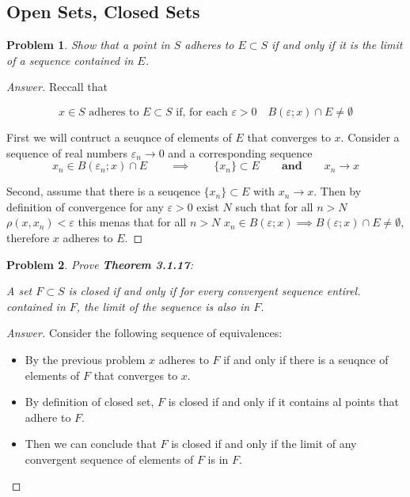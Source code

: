 \documentclass{article}
\newtheorem{problem}{Problem}[section]
\newcommand{\qiq}{\qquad \implies \qquad}
\newcommand{\qaq}{\qquad \textbf{and} \qquad}
\begin{document}
\subsection{Open Sets, Closed Sets}
\begin{problem}
    Show that a point in $S$ adheres to $E \subset S$ if and only if it is the limit of a sequence contained in $E$.
\end{problem}

\begin{proof}[Answer]
    Reccall that

    $$x \in S \text { adheres to } E \subset S \text { if, for each } \varepsilon>0 \quad  B(\varepsilon ; x)\cap E \neq \emptyset$$

    First we will contruct a seuqnce of elements of $E$ that converges to $x$. Consider a sequence of real numbers $\varepsilon_n \to 0$ and a corresponding sequence 
    $$x_n \in B(\varepsilon_n ; x)\cap E \qiq \{x_n\}\subset E \qaq x_n \to x$$

    Second, assume that there is a seuqence $\{x_n\}\subset E$ with $x_n \to x$. Then by definition of convergence for any $\varepsilon>0$ exist $N$ such that for all $n>N$ $\rho(x, x_n)<\varepsilon$ this menas that for all $n>N$ $x_n \in  B(\varepsilon; x) \implies B(\varepsilon; x) \cap E \neq \emptyset$, therefore $x$ adheres to $E$. 
\end{proof}

\begin{problem}
    Prove \textbf{Theorem 3.1.17}:

        A set $F \subset S$ is closed if and only if for every convergent sequence entirel. contained in $F$, the limit of the sequence is also in $F$.
\end{problem}


\begin{proof}[Answer]
    Consider the following sequence of equivalences: 
    \begin{itemize}
        \item By the previous problem $x$ adheres to $F$ if and only if there is a seuqnce of elements of $F$ that converges to $x$.
        \item By definition of closed set, $F$ is closed if and only if it contains al points that adhere to $F$.
        \item Then we can conclude that $F$ is closed if and only if the limit of any convergent sequence of elements of $F$ is in $F$.
    \end{itemize}
    
\end{proof}
\end{document}
